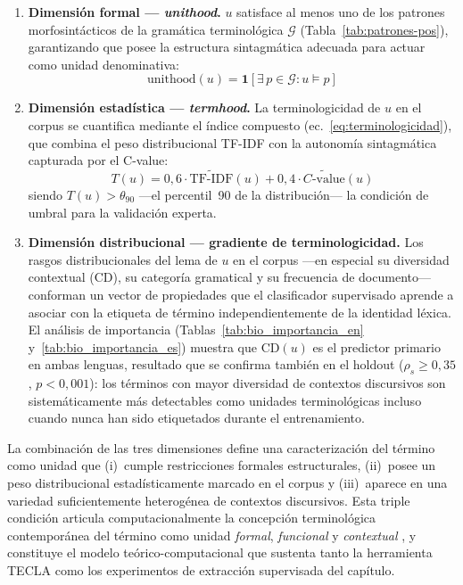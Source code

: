 \begin{enumerate}
    \item \textbf{Dimensión formal — \textit{unithood}.} $u$ satisface al menos uno de los patrones morfosintácticos de la gramática terminológica $\mathcal{G}$ (Tabla~\ref{tab:patrones-pos}), garantizando que posee la estructura sintagmática adecuada para actuar como unidad denominativa:
    \begin{equation}
        \mathrm{unithood}(u) = \mathbf{1}\!\left[\exists\, p \in \mathcal{G} : u \models p\right]
        \label{eq:unithood}
    \end{equation}

    \item \textbf{Dimensión estadística — \textit{termhood}.} La terminologicidad de $u$ en el corpus se cuantifica mediante el índice compuesto (ec.~\ref{eq:terminologicidad}), que combina el peso distribucional TF-IDF con la autonomía sintagmática capturada por el C-value:
    \begin{equation}
        T(u) = 0{,}6\cdot\widetilde{\mathrm{TF\text{-}IDF}}(u) + 0{,}4\cdot\widetilde{C\text{-value}}(u)
        \label{eq:termhood}
    \end{equation}
    siendo $T(u) > \theta_{90}$ ---el percentil~90 de la distribución--- la condición de umbral para la validación experta.

    \item \textbf{Dimensión distribucional — gradiente de terminologicidad.} Los rasgos distribucionales del lema de $u$ en el corpus ---en especial su diversidad contextual ($\mathrm{CD}$), su categoría gramatical y su frecuencia de documento--- conforman un vector de propiedades que el clasificador supervisado aprende a asociar con la etiqueta de término independientemente de la identidad léxica. El análisis de importancia (Tablas~\ref{tab:bio_importancia_en} y~\ref{tab:bio_importancia_es}) muestra que $\mathrm{CD}(u)$ es el predictor primario en ambas lenguas, resultado que se confirma también en el holdout ($\rho_s \geq 0{,}35$, $p < 0{,}001$): los términos con mayor diversidad de contextos discursivos son sistemáticamente más detectables como unidades terminológicas incluso cuando nunca han sido etiquetados durante el entrenamiento.
\end{enumerate}

La combinación de las tres dimensiones define una caracterización del término como unidad que (i)~cumple restricciones formales estructurales, (ii)~posee un peso distribucional estadísticamente marcado en el corpus y (iii)~aparece en una variedad suficientemente heterogénea de contextos discursivos. Esta triple condición articula computacionalmente la concepción terminológica contemporánea del término como unidad \emph{formal}, \emph{funcional} y \emph{contextual} \cite{cabre1999terminology}, y constituye el modelo teórico-computacional que sustenta tanto la herramienta TECLA como los experimentos de extracción supervisada del capítulo.

